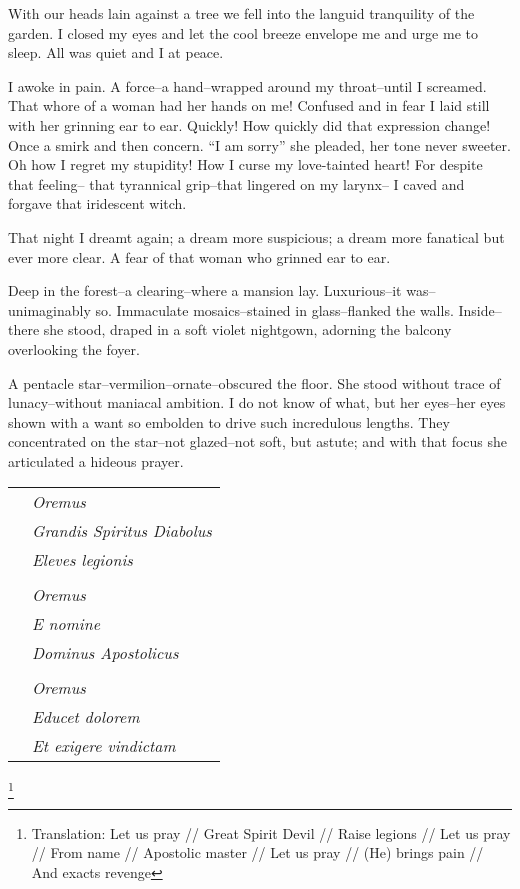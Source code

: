 \documentclass{article}
\begin{document}
With our heads lain against a tree we
fell into the languid tranquility of the garden.
I closed my eyes and let the cool breeze envelope me
and urge me to sleep. All was quiet and I at peace.


I awoke in pain.
A force--a hand--wrapped around my throat--until I screamed.
That whore of a woman had her hands on me!
Confused and in fear I laid still
with her grinning ear to ear.
Quickly! How quickly did that expression change!
Once a smirk and then concern.
``I am sorry'' she pleaded, her tone never sweeter.
Oh how I regret my stupidity!
How I curse my love-tainted heart!
For despite that feeling--
that tyrannical grip--that lingered on my larynx--
I caved and forgave that iridescent witch.


That night I dreamt again; a dream more suspicious;
a dream more fanatical but ever more clear.
A fear of that woman who grinned ear to ear. %
\VV


\noindent
Deep in the forest--a clearing--where a mansion lay.
Luxurious--it was--unimaginably so.
Immaculate mosaics--stained in glass--flanked the walls.
Inside--there she stood, draped in a soft violet nightgown,
adorning the balcony overlooking the foyer.


A pentacle star--vermilion--ornate--obscured the floor.
She stood without trace of lunacy--without
maniacal ambition.
I do not know of what, but her eyes--her eyes
shown with a want so embolden to drive
such incredulous lengths.
They concentrated on the star--not
glazed--not soft, but astute; and with
that focus she articulated a hideous prayer.
\VV


\singlespace
\begin{tabular}{ll}
& \textit{Oremus} \\
& \textit{Grandis Spiritus Diabolus} \\
& \textit{Eleves legionis} \\
& \\
& \textit{Oremus} \\
& \textit{E nomine} \\
& \textit{Dominus Apostolicus} \\
& \\
& \textit{Oremus} \\
& \textit{Educet dolorem} \\
& \textit{Et exigere vindictam} \\
\end{tabular}\revertspace\footnote{
Translation:
Let us pray // Great Spirit Devil // Raise legions //
Let us pray // From name // Apostolic master //
Let us pray // (He) brings pain // And exacts revenge
} \vspace*{3ex}
\end{document}
